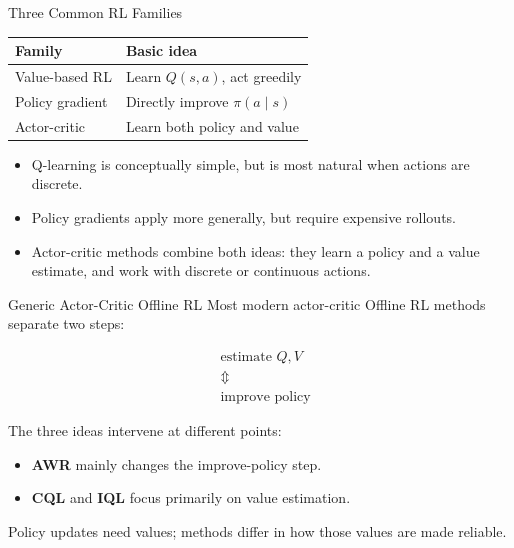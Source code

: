 \begin{frame}{Three Common RL Families}
  \centering
  \begin{tabular}{ll}
    \toprule
    \textbf{Family} & \textbf{Basic idea} \\
    \midrule
    Value-based RL & Learn $Q(s,a)$, act greedily \\
    Policy gradient & Directly improve $\pi(a \mid s)$ \\
    Actor-critic & Learn both policy and value \\
    \bottomrule
  \end{tabular}

  \vspace{0.4cm}
  \begin{itemize}
    \item Q-learning is conceptually simple, but is most natural when actions are discrete.
    \item Policy gradients apply more generally, but require expensive rollouts.
    \item Actor-critic methods combine both ideas: they learn a policy and a value estimate, and work with discrete or continuous actions.
  \end{itemize}
\end{frame}

\begin{frame}{Generic Actor-Critic Offline RL}
  Most modern actor-critic Offline RL methods separate two steps:

  \vspace{0.15cm}
  \[
  \begin{aligned}
    &\text{estimate } Q,V \\
    &\Updownarrow \\
    &\text{improve policy}
  \end{aligned}
  \]

  \vspace{0.25cm}
  The three ideas intervene at different points:
  \begin{itemize}
    \item \textbf{AWR} mainly changes the improve-policy step.
    \item \textbf{CQL} and \textbf{IQL} focus primarily on value estimation.
  \end{itemize}

  \vspace{0.25cm}
  Policy updates need values; methods differ in how those values are made reliable.
\end{frame}

